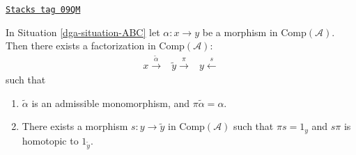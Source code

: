 \begin{lemma}[Factor]
\label{dga-lemma-factor}
\href{https://stacks.math.columbia.edu/tag/09QM}{\texttt{Stacks tag 09QM}}

In Situation \ref{dga-situation-ABC} let $\alpha : x \to y$
be a morphism in $\text{Comp}(\mathcal{A})$. Then there exists
a factorization in $\text{Comp}(\mathcal{A})$:
$$
\begin{array}{ccc}x \overset{\tilde{\alpha}}{\longrightarrow} & \tilde{y} \overset{\pi}{\longrightarrow} & y\overset{s}{\longleftarrow}\end{array}
$$
such that
\begin{enumerate}
\item $\tilde{\alpha}$ is an admissible monomorphism, and
$\pi\tilde{\alpha}=\alpha$.
\item There exists a morphism
$s:y\to\tilde{y}$ in $\text{Comp}(\mathcal{A})$
such that $\pi s=1_y$ and $s\pi$ is homotopic to $1_{\tilde{y}}$.
\end{enumerate}
\end{lemma}

